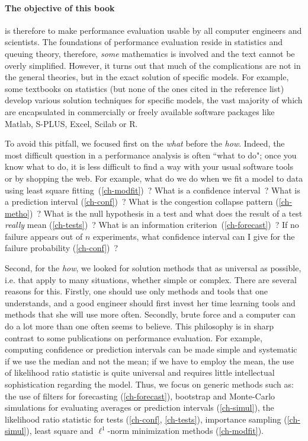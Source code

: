 \paragraph{The objective of this book} is therefore to make performance
evaluation usable by all computer engineers and scientists. The
foundations of performance evaluation reside in statistics and
queuing theory, therefore, \emph{some} mathematics is involved
and the text cannot be overly simplified. However, it turns out
that much of the complications are not in the general theories,
but in the exact solution of specific models. For example, some
textbooks on statistics (but none of the ones cited in the
reference list) develop various solution techniques for
specific models, the vast majority of which are encapsulated in
commercially or freely available software packages like Matlab,
S-PLUS, Excel, Scilab or R.

To avoid this pitfall, we focused first on the \emph{what}
before the \emph{how}. Indeed, the most difficult question in a
performance analysis is often ``what to do"; once you know what
to do, it is less difficult to find a way with your usual
software tools or by shopping the web. For example, what do we
do when we fit a model to data using least square
fitting~(\cref{ch-modfit})~? What is a confidence interval~?
What is a prediction interval (\cref{ch-conf})~? What is the
congestion collapse pattern (\cref{ch-metho})~? What is the
null hypothesis in a test and what does the result of a test
\emph{really} mean (\cref{ch-tests})~? What is an information
criterion~(\cref{ch-forecast})~? If no failure appears out of
$n$ experiments, what confidence interval can I give for the
failure probability (\cref{ch-conf})~?

Second, for the \emph{how}, we looked for solution methods that as
universal as possible, i.e. that apply to many situations, whether simple or
complex. There are several reasons for this. Firstly, one
should use only methods and tools that one understands, and a
good engineer should first invest her time learning tools and
methods that she will use more often. Secondly, brute force and
a computer can do a lot more than one often seems to believe. This
philosophy is in sharp contrast to some publications on
performance evaluation. For example, computing confidence or
prediction intervals can be made simple and systematic if we
use the median and not the mean; if we have to employ the mean,
the use of likelihood ratio statistic is quite universal and
requires little intellectual sophistication regarding the model.
Thus, we focus on generic methods such as: the use of filters for
forecasting (\cref{ch-forecast}), bootstrap and Monte-Carlo simulations
for evaluating averages or prediction intervals
(\cref{ch-simul}), the likelihood ratio statistic for tests
(\cref{ch-conf}, \cref{ch-tests}), importance sampling
(\cref{ch-simul}), least square and $\ell^1$-norm minimization
methods (\cref{ch-modfit}).

